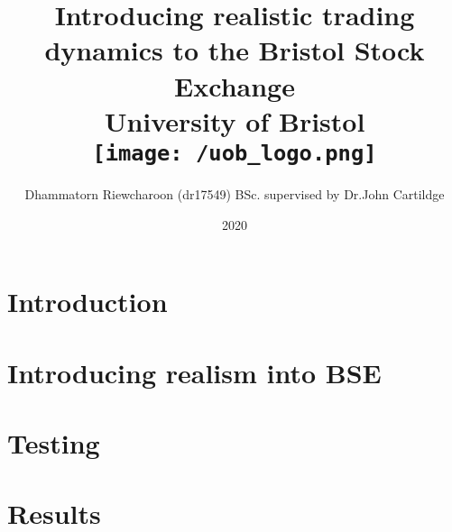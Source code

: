 \documentclass[12pt]{report}
\title{
{Introducing realistic trading dynamics to the Bristol Stock Exchange}\\
{\large University of Bristol}\\
{\texttt{[image: /uob\_logo.png]}}
}
\author{Dhammatorn Riewcharoon (dr17549) BSc. supervised by Dr.John Cartildge }
\date{2020}
\begin{document}
\maketitle
\newpage
\tableofcontents{}
\newpage

\chapter{Introduction}


\chapter{Introducing realism into BSE} 


\chapter{Testing} 


\chapter{Results} 


\end{document}
